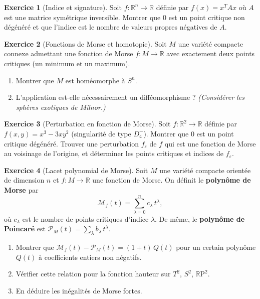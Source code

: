 \documentclass[12pt,a4paper,openany]{book}
\theoremstyle{definition}
\newtheorem{exercice}{Exercice}[chapter]
\theoremstyle{plain}
\theoremstyle{remark}
\newcommand{\R}{\mathbb{R}}
\newcommand{\RP}{\mathbb{R}\mathrm{P}}
\begin{document}
\begin{exercice}[Indice et signature]\label{exo:morse-7}
Soit $f : \R^n \to \R$ définie par $f(x) = x^T A x$ où $A$ est une matrice
symétrique inversible. Montrer que $0$ est un point critique non dégénéré et que
l'indice est le nombre de valeurs propres négatives de $A$.
\end{exercice}

\begin{exercice}[Fonctions de Morse et homotopie]\label{exo:morse-8}
Soit $M$ une variété compacte connexe admettant une fonction de Morse
$f : M \to \R$ avec exactement deux points critiques (un minimum et un maximum).
\begin{enumerate}[label=(\alph*)]
  \item Montrer que $M$ est homéomorphe à $S^n$.
  \item L'application est-elle nécessairement un difféomorphisme ?
    \emph{(Considérer les sphères exotiques de Milnor.)}
\end{enumerate}
\end{exercice}

\begin{exercice}[Perturbation en fonction de Morse]\label{exo:morse-9}
Soit $f : \R^2 \to \R$ définie par $f(x,y) = x^3 - 3xy^2$ (singularité de type
$D_4^-$). Montrer que $0$ est un point critique dégénéré. Trouver une
perturbation $f_\varepsilon$ de $f$ qui est une fonction de Morse au voisinage
de l'origine, et déterminer les points critiques et indices de $f_\varepsilon$.
\end{exercice}

\begin{exercice}[Lacet polynomial de Morse]\label{exo:morse-10}
Soit $M$ une variété compacte orientée de dimension $n$ et $f : M \to \R$ une
fonction de Morse. On définit le \textbf{polynôme de Morse} par
\[
  \mathcal{M}_f(t) = \sum_{\lambda = 0}^n c_\lambda \, t^\lambda,
\]
où $c_\lambda$ est le nombre de points critiques d'indice $\lambda$. De même, le
\textbf{polynôme de Poincaré} est $\mathcal{P}_M(t) = \sum_\lambda b_\lambda \, t^\lambda$.
\begin{enumerate}[label=(\alph*)]
  \item Montrer que $\mathcal{M}_f(t) - \mathcal{P}_M(t) = (1+t)\,Q(t)$ pour un
    certain polynôme $Q(t)$ à coefficients entiers non négatifs.
  \item Vérifier cette relation pour la fonction hauteur sur $T^2$, $S^2$, $\RP^2$.
  \item En déduire les inégalités de Morse fortes.
\end{enumerate}
\end{exercice}
\end{document}
